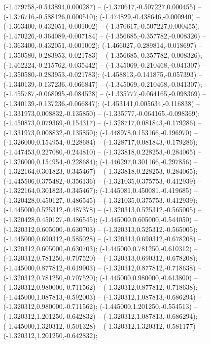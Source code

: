  (-1.479758,-0.513894,0.000287) -- (-1.370617,-0.507227,0.000455) -- (-1.376716,-0.588126,0.000510);
 (-1.474829,-0.438646,-0.000940) -- (-1.363400,-0.432051,-0.001002) -- (-1.370617,-0.507227,0.000455);
 (-1.470226,-0.364089,-0.007184) -- (-1.356685,-0.357782,-0.008326) -- (-1.363400,-0.432051,-0.001002);
 (-1.466027,-0.289814,-0.018697) -- (-1.350580,-0.283953,-0.021783) -- (-1.356685,-0.357782,-0.008326);
 (-1.462224,-0.215762,-0.035442) -- (-1.345069,-0.210468,-0.041307) -- (-1.350580,-0.283953,-0.021783);
 (-1.458813,-0.141875,-0.057393) -- (-1.340139,-0.137236,-0.066847) -- (-1.345069,-0.210468,-0.041307);
 (-1.455787,-0.068095,-0.084528) -- (-1.335777,-0.064165,-0.098369) -- (-1.340139,-0.137236,-0.066847);
 (-1.453141,0.005634,-0.116838) -- (-1.331973,0.008832,-0.135850) -- (-1.335777,-0.064165,-0.098369);
 (-1.450873,0.079369,-0.154317) -- (-1.328717,0.081843,-0.179286) -- (-1.331973,0.008832,-0.135850);
 (-1.448978,0.153166,-0.196970) -- (-1.326000,0.154954,-0.228684) -- (-1.328717,0.081843,-0.179286);
 (-1.447453,0.227080,-0.244810) -- (-1.323818,0.228253,-0.284065) -- (-1.326000,0.154954,-0.228684);
 (-1.446297,0.301166,-0.297856) -- (-1.322164,0.301823,-0.345467) -- (-1.323818,0.228253,-0.284065);
 (-1.445506,0.375482,-0.356136) -- (-1.321035,0.375753,-0.412939) -- (-1.322164,0.301823,-0.345467);
 (-1.445081,0.450081,-0.419685) -- (-1.320428,0.450127,-0.486545) -- (-1.321035,0.375753,-0.412939);
 (-1.445000,0.525312,-0.487378) -- (-1.320313,0.525312,-0.565005) -- (-1.320428,0.450127,-0.486545);
 (-1.445000,0.605000,-0.544050) -- (-1.320312,0.605000,-0.630703) -- (-1.320313,0.525312,-0.565005);
 (-1.445000,0.690312,-0.585028) -- (-1.320313,0.690312,-0.678208) -- (-1.320312,0.605000,-0.630703);
 (-1.445000,0.781250,-0.610312) -- (-1.320312,0.781250,-0.707520) -- (-1.320313,0.690312,-0.678208);
 (-1.445000,0.877812,-0.619903) -- (-1.320312,0.877812,-0.718638) -- (-1.320312,0.781250,-0.707520);
 (-1.445000,0.980000,-0.613800) -- (-1.320312,0.980000,-0.711562) -- (-1.320312,0.877812,-0.718638);
 (-1.445000,1.087813,-0.592003) -- (-1.320312,1.087813,-0.686294) -- (-1.320312,0.980000,-0.711562);
 (-1.445000,1.201250,-0.554513) -- (-1.320312,1.201250,-0.642832) -- (-1.320312,1.087813,-0.686294);
 (-1.445000,1.320312,-0.501328) -- (-1.320312,1.320312,-0.581177) -- (-1.320312,1.201250,-0.642832);
